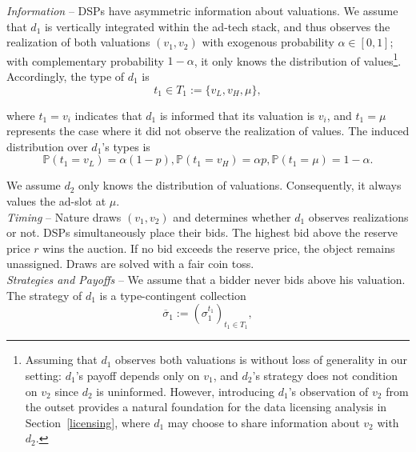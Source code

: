 \noindent \textit{Information} -- DSPs have asymmetric information about valuations. We assume that $ d_1 $ is vertically integrated within the ad-tech stack, and thus observes the realization of both valuations $ (v_1, v_2) $ with exogenous probability $ \alpha \in [0,1] $; with complementary probability $ 1 - \alpha $, it only knows the distribution of values\footnote{Assuming that $ d_1 $ observes both valuations is without loss of generality in our setting: $ d_1 $'s payoff depends only on $ v_1 $, and $ d_2 $'s strategy does not condition on $ v_2 $ since $ d_2 $ is uninformed. However, introducing $ d_1 $'s observation of $ v_2 $ from the outset provides a natural foundation for the data licensing analysis in Section~\ref{licensing}, where $ d_1 $ may choose to share information about $ v_2 $ with $ d_2 $.}. Accordingly, the type of $ d_1 $ is
\begin{equation*}
 t_1 \in T_1 := \{ v_L, v_H, \mu \},
\end{equation*}

\noindent where $ t_1 = v_i $ indicates that $ d_1 $ is informed that its valuation is $ v_i $, and $ t_1 = \mu $ represents the case where it did not observe the realization of values. The induced distribution over $ d_1 $'s types is
\begin{equation*}
\mathbb{P}(t_1 = v_L) = \alpha(1 - p), 
\mathbb{P}(t_1 = v_H) = \alpha p, 
\mathbb{P}(t_1 = \mu) = 1 - \alpha.
\end{equation*}

\noindent We assume $ d_2 $ only knows the distribution of valuations. Consequently, it always values the ad-slot at $ \mu $. \\

\noindent \textit{Timing} -- Nature draws $ (v_1, v_2) $ and determines whether $ d_1 $ observes realizations or not. DSPs simultaneously place their bids. The highest bid above the reserve price $ r $ wins the auction. If no bid exceeds the reserve price, the object remains unassigned. Draws are solved with a fair coin toss. \\

\noindent \textit{Strategies and Payoffs} -- We assume that a bidder never bids above his valuation. The strategy of $ d_1 $ is a type-contingent collection
\begin{equation*}
 \overline{\sigma}_1 := \left(\sigma_1^{t_1}\right)_{t_1 \in T_1},
\end{equation*}

